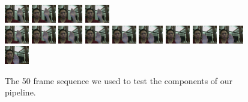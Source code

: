 \documentclass[12pt]{article}
\begin{document}
\begin{figure}[H]
\includegraphics[width=40px, height=30px]{../data/analysis/img0036.jpg}
\includegraphics[width=40px, height=30px]{../data/analysis/img0037.jpg}
\includegraphics[width=40px, height=30px]{../data/analysis/img0038.jpg}
\includegraphics[width=40px, height=30px]{../data/analysis/img0039.jpg} \\
\includegraphics[width=40px, height=30px]{../data/analysis/img0040.jpg}
\includegraphics[width=40px, height=30px]{../data/analysis/img0041.jpg}
\includegraphics[width=40px, height=30px]{../data/analysis/img0042.jpg}
\includegraphics[width=40px, height=30px]{../data/analysis/img0043.jpg}
\includegraphics[width=40px, height=30px]{../data/analysis/img0044.jpg}
\includegraphics[width=40px, height=30px]{../data/analysis/img0045.jpg}
\includegraphics[width=40px, height=30px]{../data/analysis/img0046.jpg}
\includegraphics[width=40px, height=30px]{../data/analysis/img0047.jpg}
\includegraphics[width=40px, height=30px]{../data/analysis/img0048.jpg}
\includegraphics[width=40px, height=30px]{../data/analysis/img0049.jpg}
\caption{The 50 frame sequence we used to test the components of our pipeline.}
\label{seq-original}
\end{figure}
\end{document}
